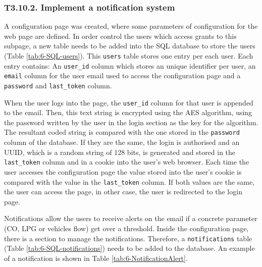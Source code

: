 \subsubsection{T3.10.2. Implement a notification system}
A configuration page was created, where some parameters of configuration for the web page are defined. In order control the users which access grants to this subpage, a new table needs to be added into the SQL database to store the users (Table \ref{tab:6-SQL-users}). This \texttt{users} table stores one entry per each user. Each entry contains: An \texttt{user\_id} column which stores an unique identifier per user, an \texttt{email} column for the user email used to access the configuration page and a \texttt{password} and \texttt{last\_token} column.

When the user logs into the page, the \texttt{user\_id} column for that user is appended to the email. Then, this text string is encrypted using the \ac{AES} algorithm, using the password written by the user in the login section as the key for the algorithm. The resultant coded string is compared with the one stored in the \texttt{password} column of the database. If they are the same, the login is authorised and an \ac{UUID}, which is a random string of 128 bits, is generated and stored in the \texttt{last\_token} column and in a cookie into the user's web browser.
Each time the user accesses the configuration page the value stored into the user's cookie is compared with the value in the \texttt{last\_token} column. If both values are the same, the user can access the page, in other case, the user is redirected to the login page.

Notifications allow the users to receive alerts on the email if a concrete parameter (CO, LPG or vehicles flow) get over a threshold. Inside the configuration page, there is a section to manage the notifications. Therefore, a \texttt{notifications} table (Table \ref{tab:6-SQL-notifications}) needs to be added to the database. An example of a notification is shown in Table \ref{tab:6-NotificationAlert}.


